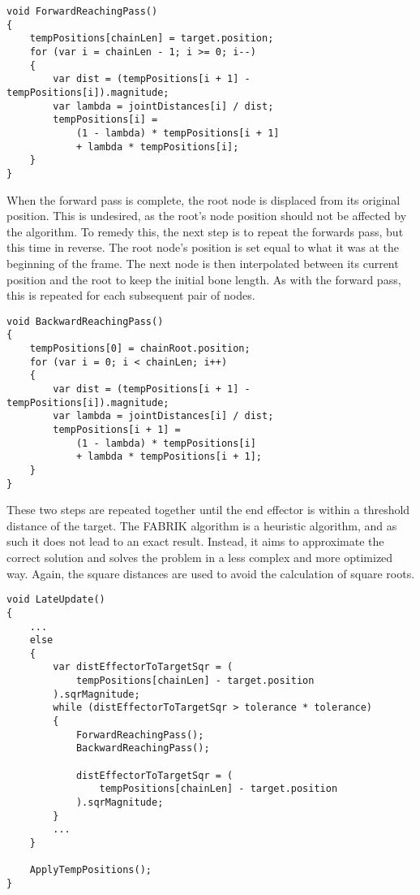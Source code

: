 \begin{lstlisting}[basicstyle=\footnotesize, numbers=none,frame=single,
caption={Forward pass},captionpos=b, label=stretch, language={[Sharp]c}]
void ForwardReachingPass()
{
    tempPositions[chainLen] = target.position;
    for (var i = chainLen - 1; i >= 0; i--)
    {
        var dist = (tempPositions[i + 1] - tempPositions[i]).magnitude;
        var lambda = jointDistances[i] / dist;
        tempPositions[i] =
            (1 - lambda) * tempPositions[i + 1]
            + lambda * tempPositions[i];
    }
}
\end{lstlisting}

When the forward pass is complete, the root node is displaced from its original
position. This is undesired, as the root's node position should not be affected
by the algorithm. To remedy this, the next step is to repeat the forwards pass,
but this time in reverse. The root node's position is set equal to what it was
at the beginning of the frame. The next node is then interpolated between its
current position and the root to keep the initial bone length. As with the
forward pass, this is repeated for each subsequent pair of nodes. 

\begin{lstlisting}[basicstyle=\footnotesize, numbers=none,frame=single,
caption={Backward pass},captionpos=b, label=stretch, language={[Sharp]c}]
void BackwardReachingPass()
{
    tempPositions[0] = chainRoot.position;
    for (var i = 0; i < chainLen; i++)
    {
        var dist = (tempPositions[i + 1] - tempPositions[i]).magnitude;
        var lambda = jointDistances[i] / dist;
        tempPositions[i + 1] =
            (1 - lambda) * tempPositions[i]
            + lambda * tempPositions[i + 1];
    }
}
\end{lstlisting}

These two steps are repeated together until the end effector is within
a threshold distance of the target. The FABRIK algorithm is a heuristic
algorithm, and as such it does not lead to an exact result. Instead, it aims to
approximate the correct solution and solves the problem in a less complex and
more optimized way. Again, the square distances are used to avoid the
calculation of square roots. 

\begin{lstlisting}[basicstyle=\footnotesize, numbers=none,frame=single,
caption={FABRIK Loop},captionpos=b, label=stretch, language={[Sharp]c}]
void LateUpdate()
{
    ...
    else
    {
        var distEffectorToTargetSqr = (
            tempPositions[chainLen] - target.position
        ).sqrMagnitude;
        while (distEffectorToTargetSqr > tolerance * tolerance)
        {
            ForwardReachingPass();
            BackwardReachingPass();

            distEffectorToTargetSqr = (
                tempPositions[chainLen] - target.position
            ).sqrMagnitude;
        }
        ...
    }

    ApplyTempPositions();
}
\end{lstlisting}

